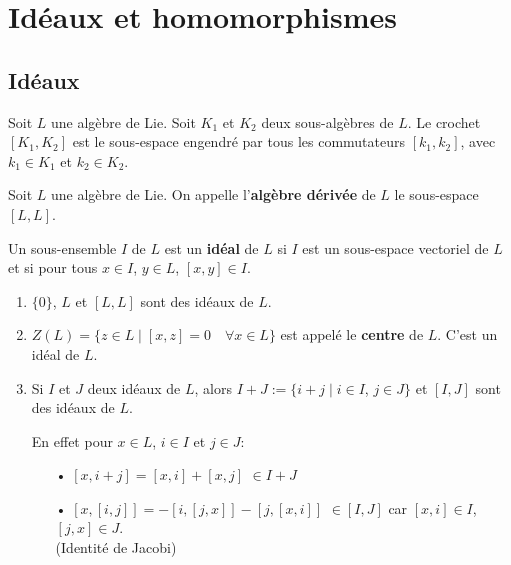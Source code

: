 \documentclass[a4paper,openany,12pt]{report}
\theoremstyle{break}
{\theorembodyfont{\upshape}
\newtheorem*{rmq}{Remarque :}
\newtheorem*{prv}{Preuve :}
\newtheorem*{ex}{Exemples :}
\newtheorem*{exe}{Exemple : }
\newtheorem*{nota}{Notation :}
\newtheorem*{dem}{D\'emonstration :}}
\begin{document}
\section{Idéaux et homomorphismes}

\subsection{Idéaux}

\begin{df}
\quad Soit $L$ une algèbre de Lie. Soit $K_1$ et $K_2$ deux sous-algèbres de $L$. Le crochet $[K_1,K_2]$ est le sous-espace engendré par tous les commutateurs $[k_1,k_2]$, avec $k_1 \in K_1$ et $k_2 \in K_2$.
\end{df}

\begin{df}
\quad Soit $L$ une algèbre de Lie. On appelle l'\textbf{algèbre dérivée} de $L$ le sous-espace $[L,L]$.
\end{df}

\begin{df}
\quad Un sous-ensemble $I$ de $L$ est un \textbf{idéal} de $L$ si $I$ est un sous-espace vectoriel de $L$ et si pour tous $x \in I$, $y \in L$, $[x, y] \in I$.
\end{df}

\begin{ex}
\begin{enumerate}
\item $\{0 \}$, $L$ et $[L,L]$ sont des idéaux de $L$.

\item $Z(L) = \{ z \in L  \mid [x,z]=0 \quad \forall x \in L\}$ est appelé le \textbf{centre} de $L$. C'est un idéal de $L$.

\item Si $I$ et $J$ deux idéaux de $L$, alors $I+J:=\{i+j \mid i \in I$, $j \in J\}$ et $[I,J]$ sont des idéaux de $L$.

En effet pour $x \in L$, $i \in I$ et $j \in J$:
\begin{itemize}
\item[•] $[x,i+j]=[x,i]+[x,j]$ $\in I+J$
\item[•]$[x,[i,j]]=-[i,[j,x]]-[j,[x,i]]$ $\in [I,J]$ car $[x,i] \in I$, $[j,x] \in J$.\\ (Identité de Jacobi)
\end{itemize}
\end{enumerate}
\end{ex}
\end{document}

